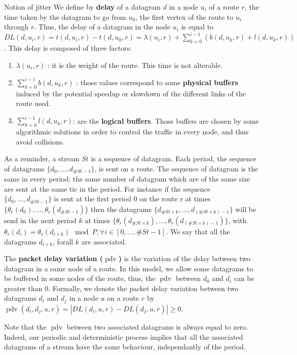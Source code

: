 \documentclass[10pt]{article}
\DeclareMathOperator{\pdv}{pdv}
\begin{document}
  \begin{subsection}{Notion of jitter}
   We define by {\bf delay} of a datagram $d$ in a node $u_i$ of a route $r$, the time taken by the datagram to go from $u_0$, the first vertex of the route to $u_i$ through $r$.
 Thus, the delay of a datagram in the node $u_i$ is equal to $DL(d,u_i,r) =  t(d,u_i,r) - t(d,u_0,r) = \lambda(u_i,r) + \sum_{k=0}^{i-1}( b(d,u_k,r) + l(d,u_k,r))$.
This delay is composed of three factors:
\begin{enumerate}
\item $\lambda(u_i,r)$ : it is the weight of the route. This time is not alterable. 
\item  $\sum_{k=0}^{i-1} b(d,u_k,r)$ : those values correspond to some {\bf physical buffers } induced by the potential speedup or slowdown of the different links of the route used.
\item $\sum_{k=0}^{i-1} l(d,u_k,r)$: are the {\bf logical buffers}. Those buffers are chosen by some algorithmic solutions in order to control the traffic in every node, and thus avoid collisions.
\end{enumerate}

As a reminder, a stream $St$ is a sequence of datagram. Each period, the sequence of datagrams $\{d_0,\ldots,d_{\#St-1}\}$, is sent on a route. The sequence of datagram is the same in every period: the same number of datagram which are of the same size are sent at the same tic in the period. For instance if the sequence $\{d_0,\ldots,d_{\#St-1}\}$ is sent at the first period $0$ on the route r at times $\{\theta_r(d_0),\ldots,\theta_r(d_{\#St-1})\}$ then the datagrams $\{d_{\#St \times k},\ldots,d_{(\#St \times k)-1}\}$ will be send in the next period $k$ at times $\{\theta_r(d_{\#St \times k}),\ldots,\theta_r(d_{(\#St \times k)-1})\}$, with $\theta_r(d_i) = \theta_r(d_{i \times k}) \mod P, \forall i \in [0,\ldots,\#St-1]$. We say that all the datagrams $d_{i \times k}$, forall $k$ are associated. 

The {\bf packet delay variation ($\pdv$) }\cite{demichelis_ip_nodate} is the variation of the delay between two datagram in a same node of a route. In this model, we allow some datagrams to be buffered in some nodes of the route, thus, the $\pdv$ between $d_0$ and $d_i$ can be greater than $0$. Formally, we denote the packet delay variation between two datagrams $d_i$ and $d_j$ in a node $u$ on a route $r$ by $\pdv(d_i,d_j,u,r) = |DL(d_i,u,r) - DL(d_j,u,r) | \ge 0$. 

Note that the $\pdv$ between two associated datagrams is always equal to zero. Indeed, our periodic and deterministic process implies that all the associated  datagrams of a stream have the same behaviour, independantly of the period.



\end{subsection}
\end{document}
